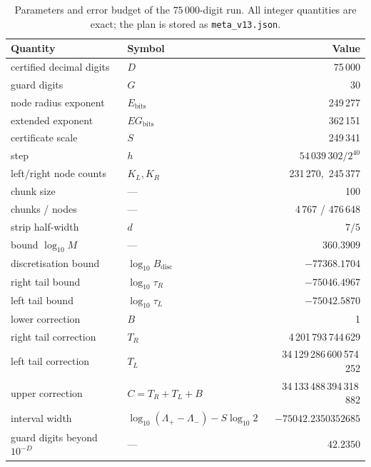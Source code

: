 \documentclass[11pt,a4paper]{article}
\theoremstyle{remark}
\begin{document}
\begin{table}[ht]
\centering
\small
\begin{tabular}{@{}llr@{}}
\toprule
Quantity & Symbol & Value \\
\midrule
certified decimal digits        & $D$              & 75\,000 \\
guard digits                    & $G$              & 30 \\
node radius exponent            & $E_{\mathrm{bits}}$ & 249\,277 \\
extended exponent               & $EG_{\mathrm{bits}}$ & 362\,151 \\
certificate scale               & $S$              & 249\,341 \\
step                            & $h$              & $54\,039\,302/2^{40}$ \\
left/right node counts          & $K_L,K_R$        & 231\,270,\ 245\,377 \\
chunk size                      & ---              & 100 \\
chunks / nodes                  & ---              & 4\,767 / 476\,648 \\
\midrule
strip half-width                & $d$              & $7/5$ \\
bound $\log_{10}M$              & ---              & $360.3909$ \\
discretisation bound            & $\log_{10}B_{\mathrm{disc}}$ & $-77368.1704$ \\
right tail bound                & $\log_{10}\tau_R$ & $-75046.4967$ \\
left tail bound                 & $\log_{10}\tau_L$ & $-75042.5870$ \\
\midrule
lower correction                & $B$              & 1 \\
right tail correction           & $T_R$            & 4\,201\,793\,744\,629 \\
left tail correction            & $T_L$            & 34\,129\,286\,600\,574\,252 \\
upper correction                & $C=T_R+T_L+B$    & 34\,133\,488\,394\,318\,882 \\
\midrule
interval width                  & $\log_{10}(\Lambda_+-\Lambda_-)-S\log_{10}2$ & $-75042.2350352685$ \\
guard digits beyond $10^{-D}$   & ---              & $42.2350$ \\
\bottomrule
\end{tabular}
\caption{Parameters and error budget of the $75\,000$-digit run. All
integer quantities are exact; the plan is stored as
\texttt{meta\_v13.json}.}
\label{tab:params}
\end{table}
\end{document}
